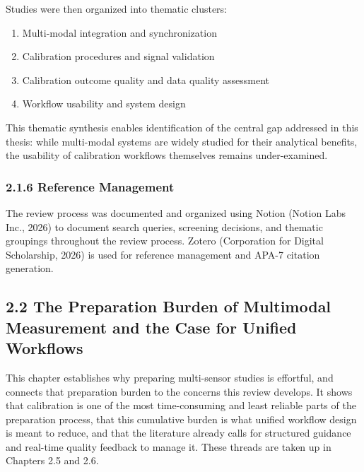 \documentclass[
]{article}
\begin{document}
Studies were then organized into thematic clusters:

\begin{enumerate}
\def\labelenumi{\arabic{enumi}.}
\item
  Multi-modal integration and synchronization
\item
  Calibration procedures and signal validation
\item
  Calibration outcome quality and data quality assessment
\item
  Workflow usability and system design
\end{enumerate}

This thematic synthesis enables identification of the central gap addressed in this thesis: while multi-modal systems are widely studied for their analytical benefits, the usability of calibration workflows themselves remains under-examined.

\hypertarget{reference-management}{%
\subsubsection{2.1.6 Reference Management}\label{reference-management}}

The review process was documented and organized using Notion (Notion Labs Inc., 2026) to document search queries, screening decisions, and thematic groupings throughout the review process. Zotero (Corporation for Digital Scholarship, 2026) is used for reference management and APA-7 citation generation.

\hypertarget{the-preparation-burden-of-multimodal-measurement-and-the-case-for-unified-workflows}{%
\subsection{2.2 The Preparation Burden of Multimodal Measurement and the Case for Unified Workflows}\label{the-preparation-burden-of-multimodal-measurement-and-the-case-for-unified-workflows}}

This chapter establishes why preparing multi-sensor studies is effortful, and connects that preparation burden to the concerns this review develops. It shows that calibration is one of the most time-consuming and least reliable parts of the preparation process, that this cumulative burden is what unified workflow design is meant to reduce, and that the literature already calls for structured guidance and real-time quality feedback to manage it. These threads are taken up in Chapters 2.5 and 2.6.
\end{document}

